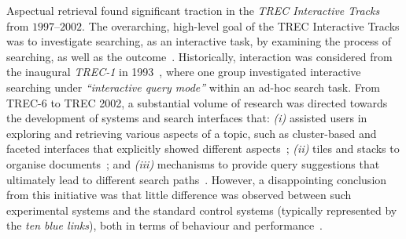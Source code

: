 
Aspectual retrieval found significant traction in the \textit{TREC Interactive Tracks} from $1997$--$2002$. The overarching, high-level goal of the TREC Interactive Tracks was to investigate searching, as an interactive task, by examining the process of searching, as well as the outcome~\cite{over2001trec}. Historically, interaction was considered from the inaugural \emph{TREC-1} in 1993~\cite{harman1993trec1}, where one group investigated interactive searching under \emph{``interactive query mode''} within an ad-hoc search task. From TREC-6 to TREC 2002, a substantial volume of research was directed towards the development of systems and search interfaces that: \emph{(i)} assisted users in exploring and retrieving various aspects of a topic, such as cluster-based and faceted interfaces that explicitly showed different aspects~\cite{villa2009aspect_interface,mcdonald1998interactive}; \emph{(ii)} tiles and stacks to organise documents~\cite{hearst1995tilebars,hearst1997texttiling,harper2006piling,iwata2012tilediversified}; and \emph{(iii)} mechanisms to provide query suggestions that ultimately lead to different search paths~\cite{umemoto2016scentbar,kato2012query_suggestion}. However, a disappointing conclusion from this initiative was that little difference was observed between such experimental systems and the standard control systems (typically represented by the \emph{ten blue links}), both in terms of behaviour and performance~\cite{voorhees05trec}.


